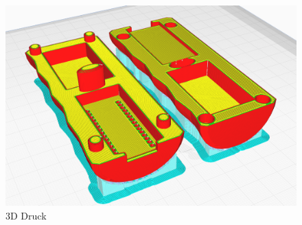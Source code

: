 \begin{figure}[H]
    \begin{center}
      \includegraphics[width=0.8\linewidth]{content/images/Joystick_3D-Print_Slicer.png}
      \caption{3D Druck}
    \end{center}
  \end{figure}